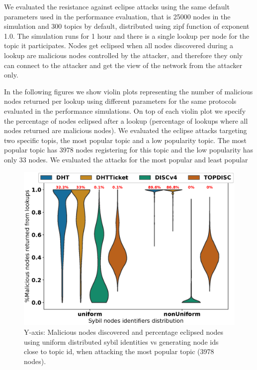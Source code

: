 We evaluated the resistance against eclipse attacks using the same default parameters used in the performance evaluation, that is 25000 nodes in the simulation and 300 topics by default, distributed using zipf function of exponent 1.0.  The simulation runs for 1 hour and there is a single lookup per node for the topic it participates.
Nodes get eclipsed when all nodes discovered during a lookup are malicious nodes controlled by the attacker, and therefore they only can connect to the attacker and get the view of the network from the attacker only. 

In the following figures we show violin plots representing the number of malicious nodes returned per lookup using different parameters for the same protocols evaluated in the performance simulations.  On top of each violin plot we specify the percentage of nodes eclipsed after a lookup (\ie percentage of lookups where all nodes returned are malicious nodes).
We evaluated the eclipse attacks targeting two specific topis, the most popular topic and a low popularity topic.
The most popular topic has 3978 nodes registering for this topic and the low popularity has only 33 nodes.
We evaluated the attacks for the most popular and least popular 


\begin{figure}[!h]
\includegraphics[width=\linewidth]{results/security/violin_idDistribution_percentageMaliciousDiscovered_t0.eps}
\caption{Y-axis: Malicious nodes discovered and percentage eclipsed nodes using uniform distributed sybil identities vs generating node ids close to topic id,   when attacking the most popular topic (3978 nodes).}
\label{fig:eclipse_distribution_t0}
\end{figure}

